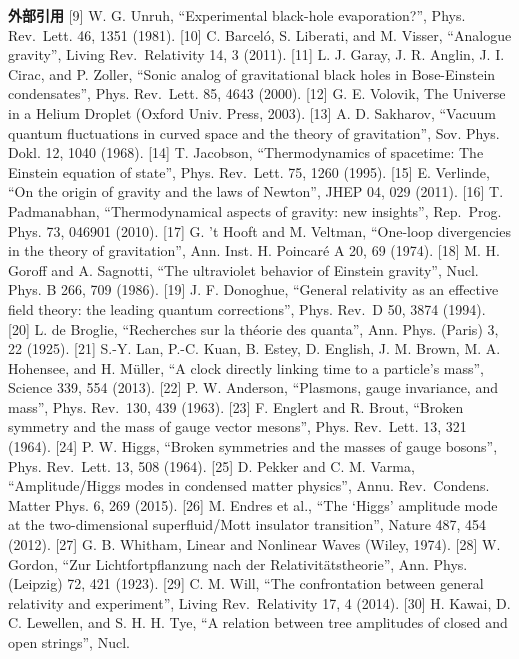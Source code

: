 \documentclass[
]{ltjarticle}
\begin{document}
\textbf{外部引用} {[}9{]} W. G. Unruh, ``Experimental black-hole
evaporation?'', Phys. Rev.~Lett. 46, 1351 (1981). {[}10{]} C. Barceló,
S. Liberati, and M. Visser, ``Analogue gravity'', Living Rev.~Relativity
14, 3 (2011). {[}11{]} L. J. Garay, J. R. Anglin, J. I. Cirac, and P.
Zoller, ``Sonic analog of gravitational black holes in Bose-Einstein
condensates'', Phys. Rev.~Lett. 85, 4643 (2000). {[}12{]} G. E. Volovik,
The Universe in a Helium Droplet (Oxford Univ. Press, 2003). {[}13{]} A.
D. Sakharov, ``Vacuum quantum fluctuations in curved space and the
theory of gravitation'', Sov. Phys. Dokl. 12, 1040 (1968). {[}14{]} T.
Jacobson, ``Thermodynamics of spacetime: The Einstein equation of
state'', Phys. Rev.~Lett. 75, 1260 (1995). {[}15{]} E. Verlinde, ``On
the origin of gravity and the laws of Newton'', JHEP 04, 029 (2011).
{[}16{]} T. Padmanabhan, ``Thermodynamical aspects of gravity: new
insights'', Rep.~Prog. Phys. 73, 046901 (2010). {[}17{]} G. 't Hooft and
M. Veltman, ``One-loop divergencies in the theory of gravitation'', Ann.
Inst. H. Poincaré A 20, 69 (1974). {[}18{]} M. H. Goroff and A.
Sagnotti, ``The ultraviolet behavior of Einstein gravity'', Nucl. Phys.
B 266, 709 (1986). {[}19{]} J. F. Donoghue, ``General relativity as an
effective field theory: the leading quantum corrections'', Phys. Rev.~D
50, 3874 (1994). {[}20{]} L. de Broglie, ``Recherches sur la théorie des
quanta'', Ann. Phys. (Paris) 3, 22 (1925). {[}21{]} S.-Y. Lan, P.-C.
Kuan, B. Estey, D. English, J. M. Brown, M. A. Hohensee, and H. Müller,
``A clock directly linking time to a particle's mass'', Science 339, 554
(2013). {[}22{]} P. W. Anderson, ``Plasmons, gauge invariance, and
mass'', Phys. Rev.~130, 439 (1963). {[}23{]} F. Englert and R. Brout,
``Broken symmetry and the mass of gauge vector mesons'', Phys.
Rev.~Lett. 13, 321 (1964). {[}24{]} P. W. Higgs, ``Broken symmetries and
the masses of gauge bosons'', Phys. Rev.~Lett. 13, 508 (1964). {[}25{]}
D. Pekker and C. M. Varma, ``Amplitude/Higgs modes in condensed matter
physics'', Annu. Rev.~Condens. Matter Phys. 6, 269 (2015). {[}26{]} M.
Endres et al., ``The `Higgs' amplitude mode at the two-dimensional
superfluid/Mott insulator transition'', Nature 487, 454 (2012). {[}27{]}
G. B. Whitham, Linear and Nonlinear Waves (Wiley, 1974). {[}28{]} W.
Gordon, ``Zur Lichtfortpflanzung nach der Relativitätstheorie'', Ann.
Phys. (Leipzig) 72, 421 (1923). {[}29{]} C. M. Will, ``The confrontation
between general relativity and experiment'', Living Rev.~Relativity 17,
4 (2014). {[}30{]} H. Kawai, D. C. Lewellen, and S. H. H. Tye, ``A
relation between tree amplitudes of closed and open strings'', Nucl.
\end{document}
